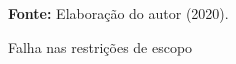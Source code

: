 \begin{figure}[ht!]
\centering

\caption{\textmd{Falha nas restrições de escopo}}
\label{fig:falha}

\par\medskip\textbf{Fonte:} Elaboração do autor (2020). \par\medskip

\end{figure}

